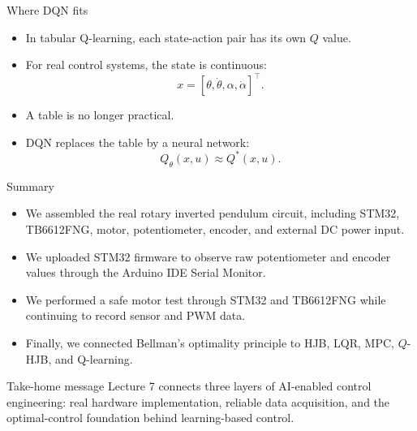 \documentclass[aspectratio=169]{beamer}
\begin{document}
\begin{frame}{Where DQN fits}

\begin{itemize}
    \item In tabular Q-learning, each state-action pair has its own \(Q\) value.
    \vspace{0.25cm}

    \item For real control systems, the state is continuous:
    \[
    x=[\theta,\dot\theta,\alpha,\dot\alpha]^\top .
    \]
    \vspace{0.15cm}

    \item A table is no longer practical.
    \vspace{0.25cm}

    \item DQN replaces the table by a neural network:
    \[
    Q_\theta(x,u)\approx Q^*(x,u).
    \]
\end{itemize}

\vspace{0.15cm}


\end{frame}

\begin{frame}{Summary }

\begin{itemize}
    \item We assembled the real rotary inverted pendulum circuit, including STM32, TB6612FNG, motor, potentiometer, encoder, and external DC power input.


    \item We uploaded STM32 firmware to observe raw potentiometer and encoder values through the Arduino IDE Serial Monitor.


    \item We performed a safe motor test through STM32 and TB6612FNG while continuing to record sensor and PWM data.


    \item Finally, we connected Bellman's optimality principle to HJB, LQR, MPC, \(Q\)-HJB, and Q-learning.
\end{itemize}



\begin{alertblock}{Take-home message}
\small
Lecture 7 connects three layers of AI-enabled control engineering:
real hardware implementation, reliable data acquisition, and the optimal-control foundation behind learning-based control.
\end{alertblock}

\end{frame}
\end{document}
